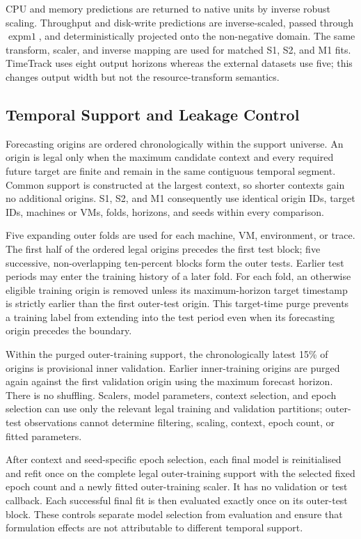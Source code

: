 \documentclass[a4paper,11pt]{article}
\begin{document}
CPU and memory predictions are returned to native units by inverse robust
scaling.  Throughput and disk-write predictions are inverse-scaled, passed
through $\operatorname{expm1}$, and deterministically projected onto the
non-negative domain.  The same transform, scaler, and inverse mapping are used
for matched S1, S2, and M1 fits.  TimeTrack uses eight output horizons whereas
the external datasets use five; this changes output width but not the
resource-transform semantics.

\subsection*{Temporal Support and Leakage Control}


Forecasting origins are ordered chronologically within the support universe.
An origin is legal only when the maximum candidate context and every required
future target are finite and remain in the same contiguous temporal segment.
Common support is constructed at the largest context, so shorter contexts gain
no additional origins.  S1, S2, and M1 consequently use identical origin IDs,
target IDs, machines or VMs, folds, horizons, and seeds within every
comparison.

Five expanding outer folds are used for each machine, VM, environment, or
trace.  The first half of the ordered legal origins precedes the first test
block; five successive, non-overlapping ten-percent blocks form the outer
tests.  Earlier test periods may enter the training history of a later fold.
For each fold, an otherwise eligible training origin is removed unless its
maximum-horizon target timestamp is strictly earlier than the first outer-test
origin.  This target-time purge prevents a training label from extending into
the test period even when its forecasting origin precedes the boundary.

Within the purged outer-training support, the chronologically latest 15\% of
origins is provisional inner validation.  Earlier inner-training origins are
purged again against the first validation origin using the maximum forecast
horizon.  There is no shuffling.  Scalers, model parameters, context selection,
and epoch selection can use only the relevant legal training and validation
partitions; outer-test observations cannot determine filtering, scaling,
context, epoch count, or fitted parameters.

After context and seed-specific epoch selection, each final model is
reinitialised and refit once on the complete legal outer-training support with
the selected fixed epoch count and a newly fitted outer-training scaler.  It
has no validation or test callback.  Each successful final fit is then
evaluated exactly once on its outer-test block.  These controls separate model
selection from evaluation and ensure that formulation effects are not
attributable to different temporal support.
\end{document}

